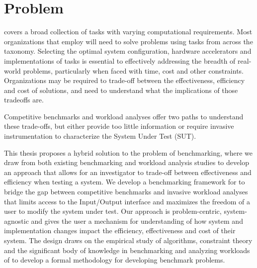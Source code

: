 \section{Problem}
\label{section:12-problem}

\gai covers a broad collection of tasks with varying computational requirements. 
Most organizations that employ \gai will need to solve problems using tasks from across the \gai taxonomy. 
Selecting the optimal system configuration, hardware accelerators and implementations of \gai tasks is essential to effectively addressing the breadth of real-world problems, particularly when faced with time, cost and other constraints. 
Organizations may be required to trade-off between the effectiveness, efficiency and cost of solutions, and need to understand what the implications of those tradeoffs are. 

Competitive benchmarks and workload analyses offer two paths to understand these trade-offs, but either provide too little information or require invasive instrumentation to characterize the System Under Test (SUT).

This thesis proposes a hybrid solution to the problem of \gai benchmarking, where we draw from both existing benchmarking and workload analysis studies to develop an approach that allows for an investigator to trade-off between effectiveness and efficiency when testing a system.
We develop a benchmarking framework for \gai to bridge the gap between competitive benchmarks and invasive workload analyses that limits access to the Input/Output interface and maximizes the freedom of a user to modify the system under test.
Our approach is problem-centric, system-agnostic and gives the user a mechanism for understanding of how system and implementation changes impact the efficiency, effectiveness and cost of their system. 
The design draws on the empirical study of algorithms, constraint theory and the significant body of knowledge in benchmarking and analyzing workloads of \gai to develop a formal methodology for developing \gai benchmark problems. 


